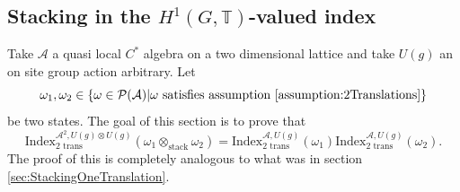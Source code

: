 \documentclass[12pt,a4paper,twoside]{article}
\newcommand{\PP}{\mathcal P}
\newcommand{\TT}{\mathbb T}
\renewcommand{\AA}{\mathcal A}
\theoremstyle{definition}
\numberwithin{equation}{section}
\begin{document}
\subsection{Stacking in the $H^1(G,\TT)$-valued index}\label{sec:StackingTwoTranslations}
Take $\AA$ a quasi local $C^*$ algebra on a two dimensional lattice and take $U(g)$ an on site group action arbitrary. Let
\begin{equation}
	\omega_1,\omega_2\in\{\omega\in\PP(\AA)| \omega\text{ satisfies assumption \ref{assumption:2Translations}}\}
\end{equation}
be two states. The goal of this section is to prove that
\begin{equation}\label{eq:IndexMorphismUnderStackingTwoTranslations}
	\textrm{Index}^{\AA^2,U(g)\otimes U(g)}_{\text{2 trans}}(\omega_1\otimes_{\text{stack}}\omega_2)=\textrm{Index}^{\AA,U(g)}_{\text{2 trans}}(\omega_1)\textrm{Index}^{\AA,U(g)}_{\text{2 trans}}(\omega_2).
\end{equation}
The proof of this is completely analogous to what was in section \ref{sec:StackingOneTranslation}.
\appendix
\end{document}
